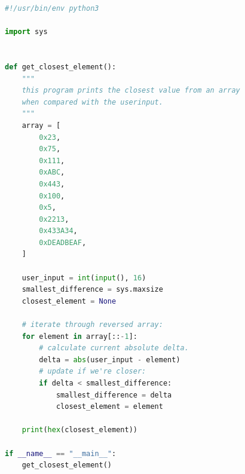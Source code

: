 \begin{lstlisting}[language=python,name={finding the closest element with Python},label={python}]
#!/usr/bin/env python3

import sys


def get_closest_element():
    """
    this program prints the closest value from an array
    when compared with the userinput.
    """
    array = [
        0x23,
        0x75,
        0x111,
        0xABC,
        0x443,
        0x100,
        0x5,
        0x2213,
        0x433A34,
        0xDEADBEAF,
    ]

    user_input = int(input(), 16)
    smallest_difference = sys.maxsize
    closest_element = None

    # iterate through reversed array:
    for element in array[::-1]:
        # calculate current absolute delta.
        delta = abs(user_input - element)
        # update if we're closer:
        if delta < smallest_difference:
            smallest_difference = delta
            closest_element = element

    print(hex(closest_element))

if __name__ == "__main__":
    get_closest_element()
\end{lstlisting}
\begin{markdown}

\end{markdown}